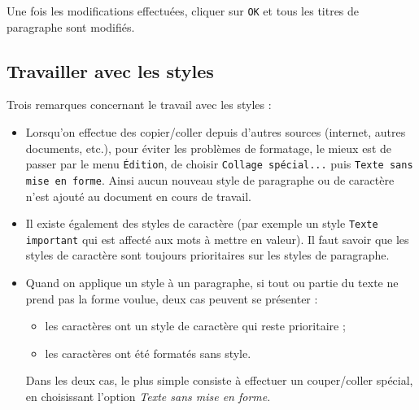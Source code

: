 \begin{enumerate}


Une fois les modifications effectuées, cliquer sur \texttt{OK} et tous les titres de paragraphe sont modifiés.%


\end{enumerate}


\subsection{Travailler avec les styles}\label{Texte3travaillerStyle}

Trois remarques concernant le travail avec les styles :

\begin{itemize}
\vspace{8pt}\item Lorsqu'on effectue des copier/coller depuis d'autres sources (internet, autres documents, etc.), pour éviter les problèmes de formatage, le mieux est de passer par le menu \texttt{Édition}, de choisir \texttt{Collage spécial...} puis \texttt{Texte sans mise en forme}. Ainsi aucun nouveau style de paragraphe ou de caractère n'est ajouté au document en cours de travail.
\vspace{8pt}\item Il existe également des styles de caractère (par exemple un style \texttt{Texte important} qui est affecté aux mots à mettre en valeur). Il faut savoir que les styles de caractère sont toujours prioritaires sur les styles de paragraphe.
\vspace{8pt}\item Quand on applique un style à un paragraphe, si tout ou partie du texte ne prend pas la forme voulue, deux cas peuvent se présenter :
    \begin{itemize}
    \item les caractères ont un style de caractère qui reste prioritaire ;
    \item les caractères ont été formatés sans style.
    \end{itemize}
Dans les deux cas, le plus simple consiste à effectuer un couper/coller spécial, en choisissant l'option \emph{Texte sans mise en forme}.
\end{itemize}


